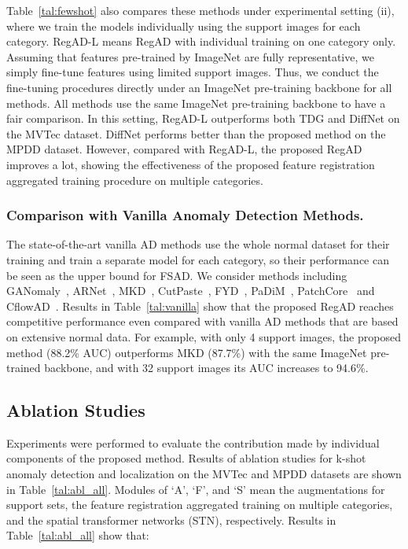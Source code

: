 \documentclass[runningheads]{llncs}
\begin{document}
Table~\ref{tal:fewshot} also compares these methods under experimental setting (ii), where we train the models individually using the support images for each category. RegAD-L means RegAD with individual training on one category only. Assuming that features pre-trained by ImageNet are fully representative, we simply fine-tune features using limited support images. Thus, we conduct the fine-tuning procedures directly under an ImageNet pre-training backbone for all methods. All methods use the same ImageNet pre-training backbone to have a fair comparison. In this setting, RegAD-L outperforms both TDG and DiffNet on the MVTec dataset. DiffNet performs better than the proposed method on the MPDD dataset. However, compared with RegAD-L, the proposed RegAD improves a lot, showing the effectiveness of the proposed feature registration aggregated training procedure on multiple categories.

\subsubsection{Comparison with Vanilla Anomaly Detection Methods.} 
The state-of-the-art vanilla AD methods use the whole normal dataset for their training and train a separate model for each category, so their performance can be seen as the upper bound for FSAD. We consider methods including GANomaly~\cite{ganomaly}, ARNet~\cite{ARNet}, MKD~\cite{MKD}, CutPaste~\cite{cutpaste}, FYD~\cite{focus}, PaDiM~\cite{defard2021padim}, PatchCore~\cite{patchcore} and CflowAD~\cite{cflow}. Results in Table~\ref{tal:vanilla} show that the proposed RegAD reaches competitive performance even compared with vanilla AD methods that are based on extensive normal data. For example, with only 4 support images, the proposed method (88.2\% AUC) outperforms MKD (87.7\%) with the same ImageNet pre-trained backbone, and with 32 support images its AUC increases to 94.6\%.

\subsection{Ablation Studies}\label{sec:abl}
Experiments were performed to evaluate the contribution made by individual components of the proposed method. Results of ablation studies for k-shot anomaly detection and localization on the MVTec and MPDD datasets are shown in Table~\ref{tal:abl_all}. Modules of ‘A’, ‘F’, and ‘S’ mean the augmentations for support sets, the feature registration aggregated training on multiple categories, and the spatial transformer networks (STN), respectively. Results in Table~\ref{tal:abl_all} show that: 
\end{document}
